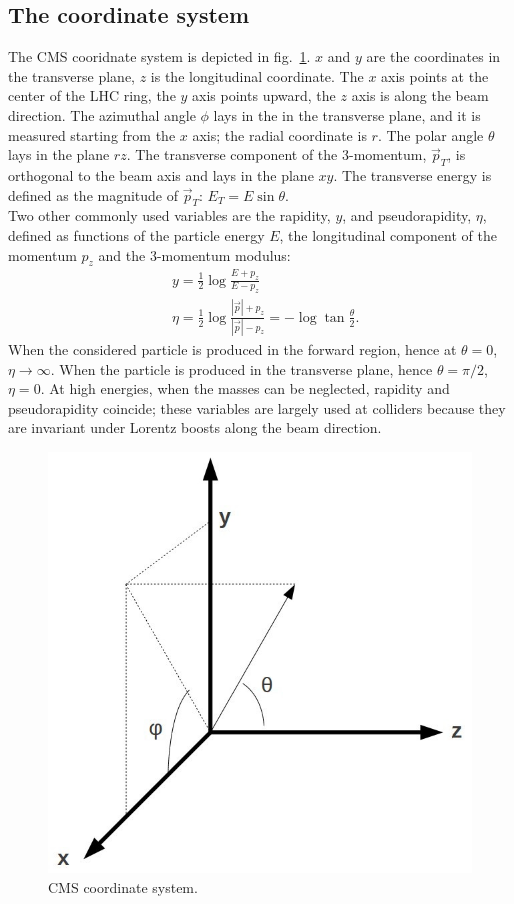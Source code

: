 \subsection{The coordinate system}
The CMS cooridnate system is depicted in fig.~\ref{fig:CMS_CoordSys}. $x$ and $y$ are the coordinates in the transverse plane, $z$ is the longitudinal coordinate. The $x$ axis points at the center of the LHC ring, the $y$ axis points upward, the $z$ axis is along the beam direction. The azimuthal angle $\phi$ lays in the in the transverse plane, and it is measured starting from the $x$ axis; the radial coordinate is $r$. The polar angle $\theta$ lays in the plane $rz$. The transverse component of the 3-momentum, $\vec{p}_T$, is orthogonal to the beam axis and lays in the plane $xy$. The transverse energy is defined as the magnitude of $\vec{p}_T$: $E_T = E \sin{\theta}$.\\
Two other commonly used variables are the rapidity, $y$, and pseudorapidity, $\eta$, defined as functions of the particle energy $E$, the longitudinal component of the momentum $p_z$ and the 3-momentum modulus:
\begin{equation}
\begin{split}
 & y = \frac{1}{2} \log{\frac{E + p_z}{E - p_z}}\\
 & \eta = \frac{1}{2} \log{\frac{|\vec{p}| + p_z}{|\vec{p}| - p_z}} = -\log{\tan{\frac{\theta}{2}}}.
\end{split}
\end{equation}
When the considered particle is produced in the forward region, hence at $\theta = 0$, $\eta \rightarrow \infty$. When the particle is produced in the transverse plane, hence $\theta = \pi /2$, $\eta = 0$. At high energies, when the masses can be neglected, rapidity and pseudorapidity coincide; these variables are largely used at colliders because they are invariant under Lorentz boosts along the beam direction.

\begin{figure}[!htb]
  \centering
    \includegraphics[width=.3\textwidth]{figures/CMS_CoordSys.jpg}
  \caption{CMS coordinate system.}
  \label{fig:CMS_CoordSys}
\end{figure}


